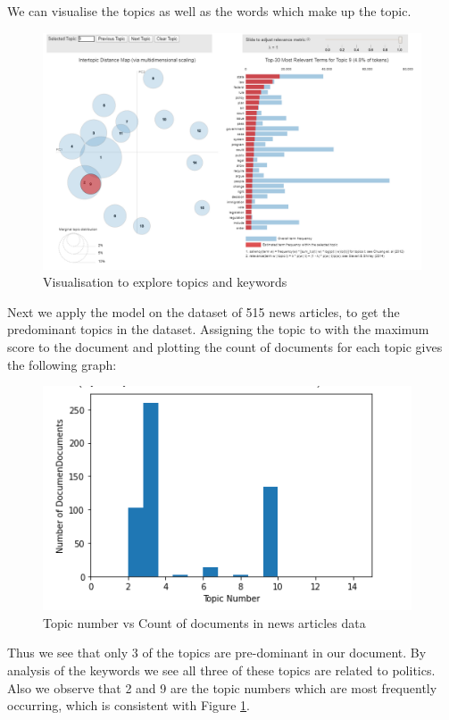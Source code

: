 \documentclass{article}
\begin{document}
We can visualise the topics as well as the words which make up the topic.
\begin{figure}[H]
    \centering
    \includegraphics[scale=0.7]{poli.PNG}
    \caption{Visualisation to explore topics and keywords}
    \label{Visualisation to explore topics and keywords}
\end{figure}

Next we apply the model on the dataset of 515 news articles, to get the predominant topics in the dataset. Assigning the topic to with the maximum score to the document and plotting the count of documents for each topic gives the following graph:

\begin{figure}[H]
    \centering
    \includegraphics[scale=1]{dist.PNG}
    \caption{Topic number vs Count of documents in news articles data}
    \label{Topic number vs Count of documents in news articles data}
\end{figure}

Thus we see that only 3 of the topics are pre-dominant in our document. By analysis of the keywords we see all three of these topics are related to politics. Also we observe that 2 and 9 are the topic numbers which are most  frequently occurring, which is consistent with Figure \ref{Visualisation to explore topics and keywords}. 
\end{document}
